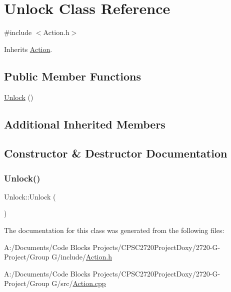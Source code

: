 \hypertarget{class_unlock}{}\section{Unlock Class Reference}
\label{class_unlock}


{\ttfamily \#include $<$Action.\+h$>$}



Inherits \mbox{\hyperlink{class_action}{Action}}.

\subsection*{Public Member Functions}
\begin{DoxyCompactItemize}
\item 
\mbox{\hyperlink{class_unlock_ab28d8091eba117251cacba2f5cd799df}{Unlock}} ()
\end{DoxyCompactItemize}
\subsection*{Additional Inherited Members}


\subsection{Constructor \& Destructor Documentation}
\mbox{\label{class_unlock_ab28d8091eba117251cacba2f5cd799df}} 
\subsubsection{\texorpdfstring{Unlock()}{Unlock()}}
{\footnotesize\ttfamily Unlock\+::\+Unlock (\begin{DoxyParamCaption}{ }\end{DoxyParamCaption})}



The documentation for this class was generated from the following files\+:\begin{DoxyCompactItemize}
\item 
A\+:/\+Documents/\+Code Blocks Projects/\+C\+P\+S\+C2720\+Project\+Doxy/2720-\/\+G-\/\+Project/\+Group G/include/\mbox{\hyperlink{_action_8h}{Action.\+h}}\item 
A\+:/\+Documents/\+Code Blocks Projects/\+C\+P\+S\+C2720\+Project\+Doxy/2720-\/\+G-\/\+Project/\+Group G/src/\mbox{\hyperlink{_action_8cpp}{Action.\+cpp}}\end{DoxyCompactItemize}
